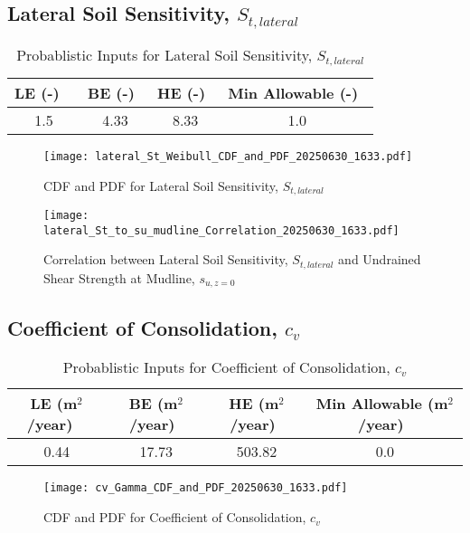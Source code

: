 \documentclass{article}
\begin{document}
\subsection*{Lateral Soil Sensitivity, $S_{{t,lateral}}$}
\begin{table}[h!]
\centering
\caption{Probablistic Inputs for Lateral Soil Sensitivity, $S_{{t,lateral}}$}
\begin{tabular}{|c|c|c|c|}
\hline
LE (-) \ & BE (-)\ & HE (-)\ & Min Allowable (-)\ \\
\hline
1.5 & 4.33 & 8.33 & 1.0 \\
\hline
\end{tabular}
\end{table}
\begin{figure}[h!]
\centering
\texttt{[image: lateral\_St\_Weibull\_CDF\_and\_PDF\_20250630\_1633.pdf]}
\caption{CDF and PDF for Lateral Soil Sensitivity, $S_{{t,lateral}}$}
\end{figure}
\begin{figure}[h!]
\centering
\texttt{[image: lateral\_St\_to\_su\_mudline\_Correlation\_20250630\_1633.pdf]}
\caption{Correlation between Lateral Soil Sensitivity, $S_{{t,lateral}}$ and Undrained Shear Strength at Mudline, $s_{{u,z=0}}$}
\end{figure}
\clearpage
\subsection*{Coefficient of Consolidation, $c_v$}
\begin{table}[h!]
\centering
\caption{Probablistic Inputs for Coefficient of Consolidation, $c_v$}
\begin{tabular}{|c|c|c|c|}
\hline
LE (m$^2$/year) \ & BE (m$^2$/year)\ & HE (m$^2$/year)\ & Min Allowable (m$^2$/year)\ \\
\hline
0.44 & 17.73 & 503.82 & 0.0 \\
\hline
\end{tabular}
\end{table}
\begin{figure}[h!]
\centering
\texttt{[image: cv\_Gamma\_CDF\_and\_PDF\_20250630\_1633.pdf]}
\caption{CDF and PDF for Coefficient of Consolidation, $c_v$}
\end{figure}
\clearpage
\end{document}
